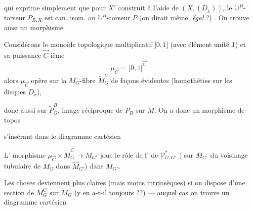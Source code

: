 \documentclass[11pt,a4paper]{article}
\begin{document}
qui exprime simplement que pour $X'$ construit à l'aide de
$(X, (D_{\tilde{x}}))$,  le $\mathbb{U}^{B}$-torseur $P_{B,X}$
\struck{\ill{}} est can. isom. au $\mathbb{U}^{B}$-torseur $P$ (on dirait même,
\textit{égal} ?) \ill{}. On trouve ainsi un morphisme


Considérons le monoïde topologique multiplicatif $]0,1]$ (avec élément
unité $1$) et sa puissance $\vec{C}$-ième
\[
\mu_{\vec{C}} = \, ]0,1]^{\vec{C}}
\]
\add{il vaut mieux prendre $]0,1]^{C}$, sinon il y a des \ill{}}
alors $\mu_{\vec{C}}$ opère sur la $M_G$-fibre $\widetilde{M}^C_G$ de
façons évidentes (homothéties sur les disques $D_{\tilde{x}}$),

donc aussi sur $\widetilde{P}^B_G$,  image réciproque
de $P_B$ sur $M$. On a donc un  morphisme de topos


s'insérant dans le diagramme cartésien


L' morphisme $\mu_{\vec{C}} \times \widetilde{M}^C_G \to M_{G'}$
joue le rôle de l' de $\mathcal{V}^{*}_{G,G'}$
 ( sur $M_{G'}$ du voisinage tubulaire de
$M_G$ dans $\widehat{M}_{G'}$) dans $M_{G'}$.

Les choses deviennent plus claires  (mais moins
intrinsèques) si on dispose d'une section de $M^C_G$ sur $M_G$ (y en a-t-il
toujours ??) — auquel cas on trouve un diagramme cartésien
\end{document}

